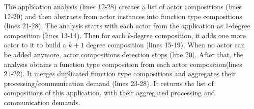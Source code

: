 The application analysis (lines 12-28) creates a list of actor compositions (lines 12-20) and then abstracts from actor instances into function type compositions (lines 21-28). The analysis starts with each actor from the application as 1-degree composition (lines 13-14). Then for each $k$-degree composition, it adds one more actor to it to build a $k+1$ degree composition (lines 15-19). When no actor can be added anymore, actor compositions detection stops (line 20). After that, the analysis obtains a function type composition from each actor composition(lines 21-22). It merges duplicated function type compositions and aggregates their processing/communication demand (lines 23-28). It returns the list of compositions of this application, with their aggregated processing and communication demands. 
